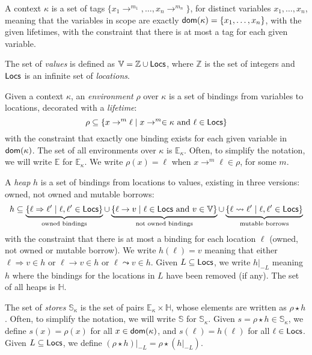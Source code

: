 \begin{definition}[Context]\label{def:context}
  A context $\kappa$ is a set of tags $\{x_1\to^{m_1},\ldots,x_n\to^{m_n}\}$,
  for distinct variables $x_1,\ldots,x_n$,
  meaning that the variables in scope are exactly
  $\mathsf{dom}(\kappa)=\{x_1,\ldots,x_n\}$, with the given lifetimes,
  with the constraint that there is at most a tag for each
  given variable.
\end{definition}

\begin{definition}[Values]\label{def:values}
  The set of \emph{values} is defined as $\mathbb{V}=\mathbb{Z}\cup\mathsf{Locs}$,
  where $\mathbb{Z}$ is the set of integers and
  $\mathsf{Locs}$ is an infinite set of \emph{locations}.
\end{definition}

\begin{definition}[Domains]\label{def:domains}
  Given a context $\kappa$, an \emph{environment} $\rho$ over $\kappa$
  is a set of bindings from variables to locations, decorated with a \emph{lifetime}:
  \[
  \rho\subseteq\{x\to^m\ell\mid x\to^m\in\kappa\text{ and }\ell\in\mathsf{Locs}\}
  \]
  with the constraint that exactly one binding exists for each given variable in $\mathsf{dom}(\kappa)$.
  The set of all environments over $\kappa$ is $\mathbb{E}_\kappa$.
  Often, to simplify the notation, we will write $\mathbb{E}$ for $\mathbb{E}_\kappa$.
  We write $\rho(x)=\ell$ when $x\rightarrow^m\ell\in\rho$, for some $m$.

  A \emph{heap} $h$ is a set of bindings from locations to values,
  existing in three versions: owned, not owned and mutable borrows:
  \[
  h\subseteq
  \underbrace{\{\ell\Rightarrow\ell'\mid\ell,\ell'\in\mathsf{Locs}\}}_{\text{owned bindings}}
  \cup
  \underbrace{\{\ell\rightarrow v\mid\ell\in\mathsf{Locs}\text{ and }v\in\mathbb{V}\}}_{\text{not owned bindings}}
  \cup
  \underbrace{\{\ell\leadsto\ell'\mid\ell,\ell'\in\mathsf{Locs}\}}_{\text{mutable borrows}}
  \]
  with the constraint that there is at most a binding for each
  location $\ell$ (owned, not owned or mutable borrow). We write $h(\ell)=v$ meaning that
  either $\ell\Rightarrow v\in h$ or $\ell\rightarrow v\in h$ or $\ell\leadsto v\in h$.
  Given $L\subseteq\mathsf{Locs}$,
  we write $h|_{-L}$ meaning $h$ where the bindings for the locations in $L$
  have been removed (if any).
  The set of all heaps is $\mathbb{H}$.

  The set of \emph{stores} $\mathbb{S}_\kappa$ is the set of pairs
  $\mathbb{E}_\kappa\times\mathbb{H}$, whose elements are written as $\rho\star h$.
  Often, to simplify the notation, we will write $\mathbb{S}$ for $\mathbb{S}_\kappa$.
  Given $s=\rho\star h\in\mathbb{S}_\kappa$, we define $s(x)=\rho(x)$ for all
  $x\in\mathsf{dom}(\kappa)$, and $s(\ell)=h(\ell)$ for all $\ell\in\mathsf{Locs}$.
  Given $L\subseteq\mathsf{Locs}$, we define $(\rho\star h)|_{-L}=\rho\star(h|_{-L})$.
\end{definition}

